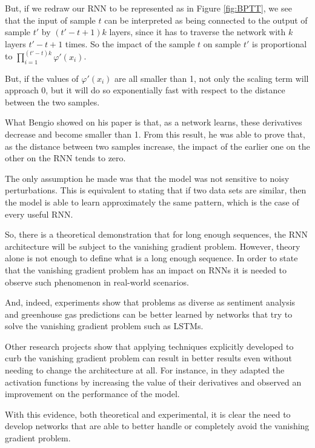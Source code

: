But, if we redraw our RNN to be represented as in Figure \ref{fig:BPTT}, we see that the input of sample $t$ can be interpreted as being connected to the output of sample $t'$ by $(t'-t + 1)k$ layers, since it has to traverse the network with $k$ layers $t'-t+1$ times.
So the impact of the sample $t$ on sample $t'$ is proportional to $\prod_{i=1}^{(t'-t)k}\varphi'(x_i)$.

But, if the values of $\varphi'(x_i)$ are all smaller than 1, not only the scaling term will approach 0, but it will do so exponentially fast with respect to the distance between the two samples.

What Bengio showed on his paper \cite{bengio1993problem} is that, as a network learns, these derivatives decrease and become smaller than 1.
From this result, he was able to prove that, as the distance between two samples increase, the impact of the earlier one on the other on the RNN tends to zero.

The only assumption he made was that the model was not sensitive to noisy perturbations.
This is equivalent to stating that if two data sets are similar, then the model is able to learn approximately the same pattern, which is the case of every useful RNN.

So, there is a theoretical demonstration that for long enough sequences, the RNN architecture will be subject to the vanishing gradient problem.
However, theory alone is not enough to define what is a long enough sequence.
In order to state that the vanishing gradient problem has an impact on RNNs it is needed to observe such phenomenon in real-world scenarios. 

And, indeed, experiments show that problems as diverse as sentiment analysis \cite{raza2021cloud} and greenhouse gas predictions \cite{ludwig2019comparison} can be better learned by networks that try to solve the vanishing gradient problem such as LSTMs.

Other research projects show that applying techniques explicitly developed to curb the vanishing gradient problem can result in better results even without needing to change the architecture at all.
For instance, in \cite{hu2021handling} they adapted the activation functions by increasing the value of their derivatives and observed an improvement on the performance of the model.

With this evidence, both theoretical and experimental, it is clear the need to develop networks that are able to better handle or completely avoid the vanishing gradient problem.

